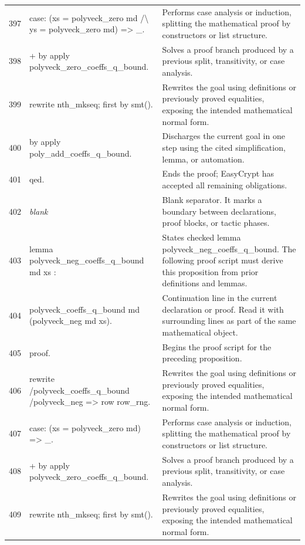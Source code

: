 \documentclass[10pt]{article}
\begin{document}
\begin{longtable}{r L{0.53\textwidth} L{0.37\textwidth}}
397 & {\ttfamily\scriptsize case: (xs = polyveck\_zero md /\textbackslash{} ys = polyveck\_zero md) => \_.} & Performs case analysis or induction, splitting the mathematical proof by constructors or list structure. \\
398 & {\ttfamily\scriptsize + by apply polyveck\_zero\_coeffs\_q\_bound.} & Solves a proof branch produced by a previous split, transitivity, or case analysis. \\
399 & {\ttfamily\scriptsize rewrite nth\_mkseq; first by smt().} & Rewrites the goal using definitions or previously proved equalities, exposing the intended mathematical normal form. \\
400 & {\ttfamily\scriptsize by apply poly\_add\_coeffs\_q\_bound.} & Discharges the current goal in one step using the cited simplification, lemma, or automation. \\
401 & {\ttfamily\scriptsize qed.} & Ends the proof; EasyCrypt has accepted all remaining obligations. \\
402 & {\ttfamily\scriptsize \emph{blank}} & Blank separator.  It marks a boundary between declarations, proof blocks, or tactic phases. \\
403 & {\ttfamily\scriptsize lemma polyveck\_neg\_coeffs\_q\_bound md xs :} & States checked lemma polyveck\_neg\_coeffs\_q\_bound.  The following proof script must derive this proposition from prior definitions and lemmas. \\
404 & {\ttfamily\scriptsize   polyveck\_coeffs\_q\_bound md (polyveck\_neg md xs).} & Continuation line in the current declaration or proof.  Read it with surrounding lines as part of the same mathematical object. \\
405 & {\ttfamily\scriptsize proof.} & Begins the proof script for the preceding proposition. \\
406 & {\ttfamily\scriptsize rewrite /polyveck\_coeffs\_q\_bound /polyveck\_neg => row row\_rng.} & Rewrites the goal using definitions or previously proved equalities, exposing the intended mathematical normal form. \\
407 & {\ttfamily\scriptsize case: (xs = polyveck\_zero md) => \_.} & Performs case analysis or induction, splitting the mathematical proof by constructors or list structure. \\
408 & {\ttfamily\scriptsize + by apply polyveck\_zero\_coeffs\_q\_bound.} & Solves a proof branch produced by a previous split, transitivity, or case analysis. \\
409 & {\ttfamily\scriptsize rewrite nth\_mkseq; first by smt().} & Rewrites the goal using definitions or previously proved equalities, exposing the intended mathematical normal form. \\

\end{longtable}
\end{document}
